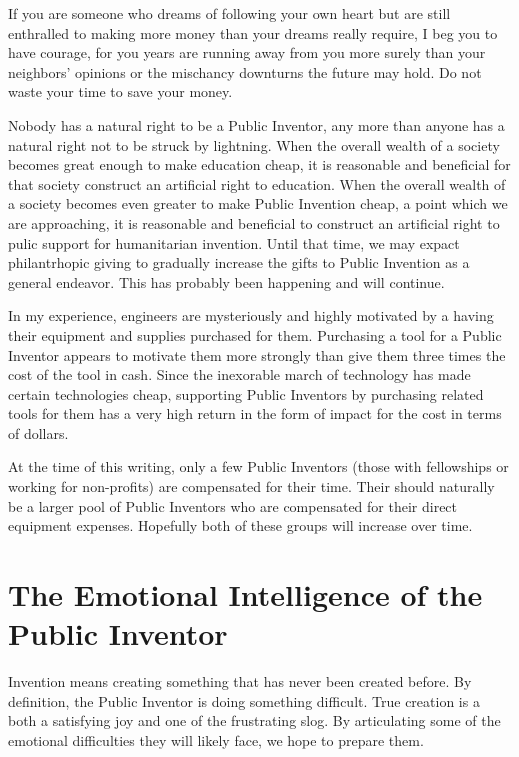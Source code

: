 \documentclass[
	fontsize=10pt, %
	twoside=false, %
	secnumdepth=1, %
]{kaobook}
\begin{document}
If you are someone who dreams of following your own heart but
are still enthralled to making more money than your dreams really
require, I beg you to have courage, for you years are running
away from you more surely than your neighbors' opinions or the
mischancy downturns the future may hold. Do not waste your
time to save your money.

Nobody has a natural right to be a Public Inventor, any more than
anyone has a natural right not to be struck by lightning.
When the overall wealth of a society becomes great enough to make
education cheap, it is reasonable and beneficial for that society construct an
artificial right to education. When the overall wealth of a society
becomes even greater to make Public Invention cheap, a point which
we are approaching, it is reasonable and beneficial to construct
an artificial right to pulic support for humanitarian invention.
Until that time, we may expact philantrhopic giving to gradually
increase the gifts to Public Invention as a general endeavor.
This has probably been happening and will continue.

In my experience, engineers are mysteriously and highly motivated by a having their
equipment and supplies purchased for them.
Purchasing a tool for a Public Inventor appears to motivate them more strongly
than give them three times the cost of the tool in cash. Since
the inexorable march of technology has made certain technologies cheap,
supporting Public Inventors by purchasing related tools for them
has a very high return in the form of impact for the cost in terms of
dollars.

At the time of this writing, only a few Public Inventors (those
with fellowships or working for non-profits) are compensated for their
time. Their should naturally be a larger pool of Public Inventors who
are compensated for their direct equipment expenses. Hopefully
both of these groups will increase over time.

\chapter{The Emotional Intelligence of the Public Inventor}

Invention means creating something that has never been
created before.
By definition, the Public Inventor is doing something
difficult.
True creation is a both a satisfying
joy and one of the frustrating slog.
By articulating some of the emotional difficulties
they will likely face, we hope to prepare them.
\end{document}
